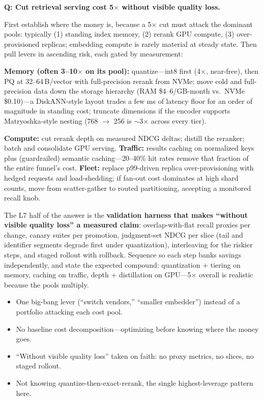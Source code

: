 \begin{interviewq}
\textbf{Q: Cut retrieval serving cost 5$\times$ without visible quality loss.}

 \quad {} \quad \badgefreq{\freqmed}

\stronganswer

First establish where the money is, because a 5$\times$ cut must attack the dominant pools: typically (1) standing index memory, (2) rerank GPU compute, (3) over-provisioned replicas; embedding compute is rarely material at steady state. Then pull levers in ascending risk, each gated by measurement:

\textbf{Memory (often 3--10$\times$ on its pool):} quantize---int8 first (4$\times$, near-free), then PQ at 32--64\,B/vector with full-precision rerank from NVMe; move cold and full-precision data down the storage hierarchy (RAM \$4--6/GB-month vs.\ NVMe \$0.10)---a DiskANN-style layout trades a few ms of latency floor for an order of magnitude in standing cost; truncate dimensions if the encoder supports Matryoshka-style nesting (768 $\to$ 256 is $\sim$3$\times$ across every tier).

\textbf{Compute:} cut rerank depth on measured NDCG deltas; distill the reranker; batch and consolidate GPU serving. \textbf{Traffic:} results caching on normalized keys plus (guardrailed) semantic caching---20--40\% hit rates remove that fraction of the entire funnel's cost. \textbf{Fleet:} replace p99-driven replica over-provisioning with hedged requests and load-shedding; if fan-out cost dominates at high shard counts, move from scatter-gather to routed partitioning, accepting a monitored recall knob.

The L7 half of the answer is the \textbf{validation harness that makes ``without visible quality loss'' a measured claim}: overlap-with-flat recall proxies per change, canary suites per promotion, judgment-set NDCG per slice (tail and identifier segments degrade first under quantization), interleaving for the riskier steps, and staged rollout with rollback. Sequence so each step banks savings independently, and state the expected compound: quantization + tiering on memory, caching on traffic, depth + distillation on GPU---5$\times$ overall is realistic because the pools multiply.

\redflags
\begin{itemize}
    \item One big-bang lever (``switch vendors,'' ``smaller embedder'') instead of a portfolio attacking each cost pool.
    \item No baseline cost decomposition---optimizing before knowing where the money goes.
    \item ``Without visible quality loss'' taken on faith: no proxy metrics, no slices, no staged rollout.
    \item Not knowing quantize-then-exact-rerank, the single highest-leverage pattern here.
\end{itemize}


\end{interviewq}
